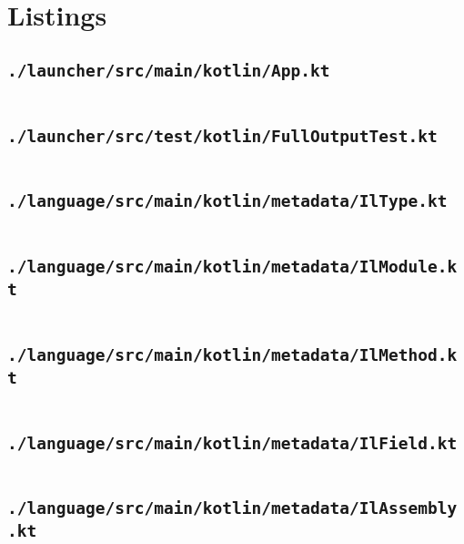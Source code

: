 \documentclass[a4paper, 11pt]{report}
\begin{document}
    \tableofcontents


    \chapter{Listings}


    \section{\lstinline{./launcher/src/main/kotlin/App.kt}}
    \inputminted{kotlin}{./launcher/src/main/kotlin/App.kt}


    \section{\lstinline{./launcher/src/test/kotlin/FullOutputTest.kt}}
    \inputminted{kotlin}{./launcher/src/test/kotlin/FullOutputTest.kt}


    \section{\lstinline{./language/src/main/kotlin/metadata/IlType.kt}}
    \inputminted{kotlin}{./language/src/main/kotlin/metadata/IlType.kt}


    \section{\lstinline{./language/src/main/kotlin/metadata/IlModule.kt}}
    \inputminted{kotlin}{./language/src/main/kotlin/metadata/IlModule.kt}


    \section{\lstinline{./language/src/main/kotlin/metadata/IlMethod.kt}}
    \inputminted{kotlin}{./language/src/main/kotlin/metadata/IlMethod.kt}


    \section{\lstinline{./language/src/main/kotlin/metadata/IlField.kt}}
    \inputminted{kotlin}{./language/src/main/kotlin/metadata/IlField.kt}


    \section{\lstinline{./language/src/main/kotlin/metadata/IlAssembly.kt}}
    \inputminted{kotlin}{./language/src/main/kotlin/metadata/IlAssembly.kt}
\end{document}
